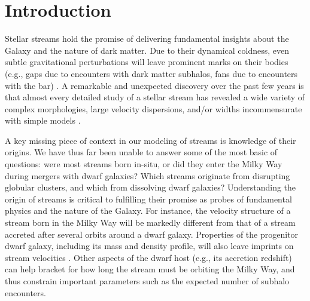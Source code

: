 \documentclass[twocolumn]{aastex63}
\begin{document}

\section{Introduction}
\label{sec:intro}





Stellar streams hold the promise of delivering fundamental insights about the Galaxy and the nature of dark matter. 
Due to their dynamical coldness, even subtle gravitational perturbations will leave prominent marks on their bodies (e.g., gaps due to encounters with dark matter subhalos, fans due to encounters with the bar) \citep[e.g.,][]{bonaca2019a}.
A remarkable and unexpected discovery over the past few years is that almost every detailed study of a stellar stream has revealed a wide variety of complex morphologies, large velocity dispersions, and/or widths incommensurate with simple models \citep[e.g.,][]{bonaca2019a, bonaca2019b,  li2020,bonaca2020b,malhan2019b}. 

A key missing piece of context in our modeling of streams is knowledge of their origins. 
We have thus far been unable to answer some of the most basic of questions: were most streams born in-situ, or did they enter the Milky Way during mergers with dwarf galaxies?  Which streams originate from disrupting globular clusters, and which from dissolving dwarf galaxies?
Understanding the origin of streams is critical to fulfilling their promise as probes of fundamental physics and the nature of the Galaxy.
For instance, the velocity structure of a stream born in the Milky Way will be markedly different from that of a stream accreted after several orbits around a dwarf galaxy. 
Properties of the progenitor dwarf galaxy, including its mass and density profile, will also leave imprints on stream velocities \citep[][]{malhan2020}. 
Other aspects of the dwarf host (e.g., its accretion redshift) can help bracket for how long the stream must be orbiting the Milky Way, and thus constrain important parameters such as the expected number of subhalo encounters.
\end{document}
